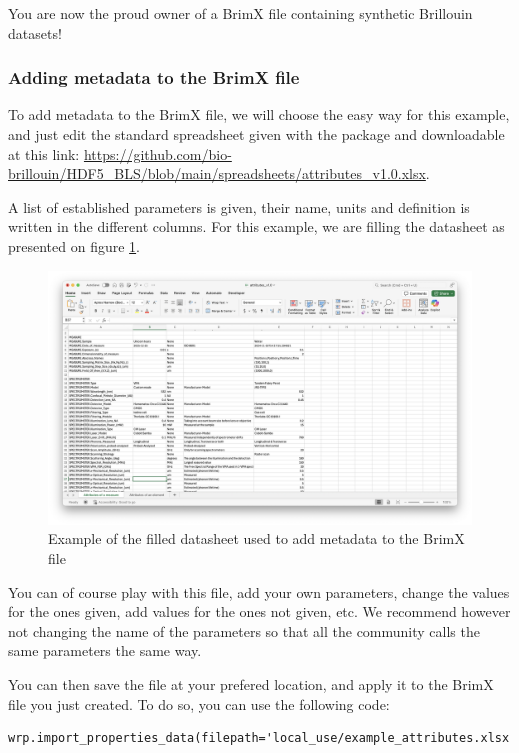 \documentclass{article}
\begin{document}
You are now the proud owner of a BrimX file containing synthetic Brillouin datasets!

\subsubsection{Adding metadata to the BrimX file}

To add metadata to the BrimX file, we will choose the easy way for this example, and just edit the standard spreadsheet given with the package and downloadable at this link: \url{https://github.com/bio-brillouin/HDF5_BLS/blob/main/spreadsheets/attributes_v1.0.xlsx}.

A list of established parameters is given, their name, units and definition is written in the different columns. For this example, we are filling the datasheet as presented on figure \ref{fig:excel_attributes}.
\begin{figure}[H]
    \centering
    \includegraphics[width=\textwidth]{img/Excel_attributes.png}
    \caption{Example of the filled datasheet used to add metadata to the BrimX file}
    \label{fig:excel_attributes}
\end{figure}

You can of course play with this file, add your own parameters, change the values for the ones given, add values for the ones not given, etc. We recommend however not changing the name of the parameters so that all the community calls the same parameters the same way.

You can then save the file at your prefered location, and apply it to the BrimX file you just created. To do so, you can use the following code:

\begin{lstlisting}
wrp.import_properties_data(filepath='local_use/example_attributes.xlsx')
\end{lstlisting}
\end{document}
